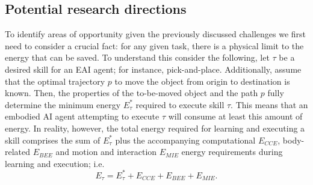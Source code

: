 \subsection{Potential research directions}
To identify areas of opportunity given the previously discussed challenges we first need to consider a crucial fact: for any given task, there is a physical limit to the energy that can be saved. To understand this consider the following, let $\tau$ be a desired skill for an EAI agent; for instance, pick-and-place. Additionally, assume that the optimal trajectory $p$ to move the object from origin to destination is known. Then, the properties of the to-be-moved object and the path $p$ fully determine the minimum energy $E^*_{\tau}$ required to execute skill $\tau$. This means that an embodied AI agent attempting to execute $\tau$ will consume at least this amount of energy. In reality, however, the total energy required for learning and executing a skill comprises the sum of $E^*_{\tau}$ plus the accompanying computational $E_{CCE}$, body-related $E_{BEE}$ and motion and interaction $E_{MIE}$ energy requirements during learning and execution; i.e.
\begin{equation}
     E_{\tau} =  E^*_{\tau} +  E_{CCE} +  E_{BEE} +  E_{MIE}.
\end{equation}
